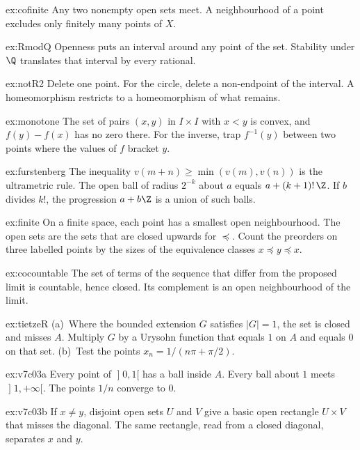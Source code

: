 \begin{hint}{ex:cofinite}
Any two nonempty open sets meet. A neighbourhood of a point excludes only finitely many points of $X$.
\end{hint}
\begin{hint}{ex:RmodQ}
Openness puts an interval around any point of the set. Stability under $\Q$ translates that interval by every rational.
\end{hint}
\begin{hint}{ex:notR2}
Delete one point. For the circle, delete a non-endpoint of the interval. A homeomorphism restricts to a homeomorphism of what remains.
\end{hint}
\begin{hint}{ex:monotone}
The set of pairs $(x,y)$ in $I\times I$ with $x<y$ is convex, and $f(y)-f(x)$ has no zero there. For the inverse, trap $f^{-1}(y)$ between two points where the values of $f$ bracket $y$.
\end{hint}
\begin{hint}{ex:furstenberg}
The inequality $v(m+n)\ge\min(v(m),v(n))$ is the ultrametric rule. The open ball of radius $2^{-k}$ about $a$ equals $a+(k+1)!\,\Z$. If $b$ divides $k!$, the progression $a+b\Z$ is a union of such balls.
\end{hint}
\begin{hint}{ex:finite}
On a finite space, each point has a smallest open neighbourhood. The open sets are the sets that are closed upwards for $\preceq$. Count the preorders on three labelled points by the sizes of the equivalence classes $x\preceq y\preceq x$.
\end{hint}
\begin{hint}{ex:cocountable}
The set of terms of the sequence that differ from the proposed limit is countable, hence closed. Its complement is an open neighbourhood of the limit.
\end{hint}
\begin{hint}{ex:tietzeR}
(a)~Where the bounded extension $G$ satisfies $|G|=1$, the set is closed and misses $A$. Multiply $G$ by a Urysohn function that equals $1$ on $A$ and equals $0$ on that set. (b)~Test the points $x_n=1/(n\pi+\pi/2)$.
\end{hint}
\begin{hint}{ex:v7c03a}
Every point of $\mathopen]0,1[$ has a ball inside $A$. Every ball about $1$ meets $\mathopen]1,+\infty[$. The points $1/n$ converge to $0$.
\end{hint}
\begin{hint}{ex:v7c03b}
If $x\ne y$, disjoint open sets $U$ and $V$ give a basic open rectangle $U\times V$ that misses the diagonal. The same rectangle, read from a closed diagonal, separates $x$ and $y$.
\end{hint}
